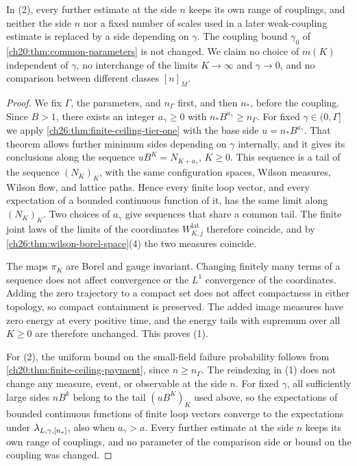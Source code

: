 In (2), every further estimate at the side $n$ keeps its own range of couplings, and neither the side $n$ nor a fixed number of scales used in a later weak-coupling estimate is replaced by a side depending on $\gamma$. The coupling bound $\gamma_0$ of \cref{ch20:thm:common-parameters} is not changed. We claim no choice of $m(K)$ independent of $\gamma$, no interchange of the limits $K\to\infty$ and $\gamma\to0$, and no comparison between different classes $[n]_M$.

\begin{proof}
We fix $\Gamma$, the parameters, and $n_\Gamma$ first, and then $n_*$, before the coupling. Since $B>1$, there exists an integer $a_\gamma\ge0$ with $n_*B^{a_\gamma}\ge n_\Gamma$. For fixed $\gamma\in(0,\Gamma]$ we apply \cref{ch26:thm:finite-ceiling-tier-one} with the base side $u=n_*B^{a_\gamma}$. That theorem allows further minimum sides depending on $\gamma$ internally, and it gives its conclusions along the sequence $uB^K=N_{K+a_\gamma}$, $K\ge0$. This sequence is a tail of the sequence $(N_K)_K$, with the same configuration spaces, Wilson measures, Wilson flow, and lattice paths. Hence every finite loop vector, and every expectation of a bounded continuous function of it, has the same limit along $(N_K)_K$. Two choices of $a_\gamma$ give sequences that share a common tail. The finite joint laws of the limits of the coordinates $W^{\mathrm{lat}}_{K,j}$ therefore coincide, and by \cref{ch26:thm:wilson-borel-space}(4) the two measures coincide.

The maps $\pi_K$ are Borel and gauge invariant. Changing finitely many terms of a sequence does not affect convergence or the $L^1$ convergence of the coordinates. Adding the zero trajectory to a compact set does not affect compactness in either topology, so compact containment is preserved. The added image measures have zero energy at every positive time, and the energy tails with supremum over all $K\ge0$ are therefore unchanged. This proves (1).

For (2), the uniform bound on the small-field failure probability follows from \cref{ch20:thm:finite-ceiling-payment}, since $n\ge n_\Gamma$. The reindexing in (1) does not change any measure, event, or observable at the side $n$. For fixed $\gamma$, all sufficiently large sides $nB^k$ belong to the tail $(uB^K)_K$ used above, so the expectations of bounded continuous functions of finite loop vectors converge to the expectations under $\lambda_{L,\gamma,[n_*]}$, also when $a_\gamma>a$. Every further estimate at the side $n$ keeps its own range of couplings, and no parameter of the comparison side or bound on the coupling was changed.
\end{proof}


